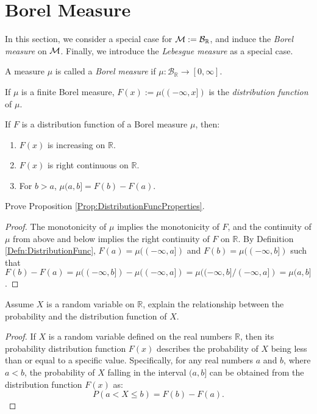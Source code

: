 \section{Borel Measure}
\begin{rem}
    In this section, we consider a special case for 
    $\mathcal{M}:=\mathcal{B}_{\mathbb{R}}$, and induce the 
    \textit{Borel measure} on $\mathcal{M}$. Finally, we introduce the 
    \textit{Lebesgue measure} as a special case.
\end{rem}
\begin{defn}
    \label{Defn:BorelMeas}
    A measure $\mu$ is called a \textit{Borel measure} if 
    $\mu:\mathcal{B}_{\mathbb{R}}\rightarrow[0,\infty]$.
\end{defn}
\begin{defn}
    \label{Defn:DistributionFunc}
    If $\mu$ is a finite Borel measure, $F(x):=\mu((-\infty,x])$ 
    is the \textit{distribution function} of $\mu$.
\end{defn}
\begin{prop}
    \label{Prop:DistributionFuncProperties}
    If $F$ is a distribution function of a Borel measure $\mu$, then:
    \begin{enumerate}
        \item $F(x)$ is increasing on $\mathbb{R}$. 
        \item $F(x)$ is right continuous on $\mathbb{R}$.
        \item For $b>a$, $\mu(a,b]=F(b)-F(a)$.
    \end{enumerate}
\end{prop}
\begin{exc}
    Prove Proposition \ref{Prop:DistributionFuncProperties}.
\end{exc}
\begin{proof}
    The monotonicity of $\mu$ implies the monotonicity of $F$,
    and the continuity of $\mu$ from above and below implies 
    the right continuity of $F$ on $\mathbb{R}$. By Definition
    \ref{Defn:DistributionFunc}, $F(a)=\mu((-\infty,a])$ and
    $F(b)=\mu((-\infty,b])$ such that $F(b)-F(a)=
    \mu((-\infty,b])-\mu((-\infty,a])=\mu((-\infty,b]/(-\infty,a])=\mu(a,b]$.
\end{proof}
\begin{exc}
    Assume $X$ is a random variable on $\mathbb{R}$, 
    explain the relationship between the probability and 
    the distribution function of $X$.
\end{exc}
\begin{proof}
    If $X$ is a random variable defined on the real numbers 
    $\mathbb{R}$, then its probability distribution function
    $F(x)$ describes the probability of $X$ being less than 
    or equal to a specific value. Specifically, for any real 
    numbers $a$ and $b$, where $a < b$, the probability of $X$
    falling in the interval $(a, b]$ can be obtained from the 
    distribution function $F(x)$ as:
    \begin{displaymath}
        P(a<X\leq b)=F(b)-F(a).
    \end{displaymath}
\end{proof}
